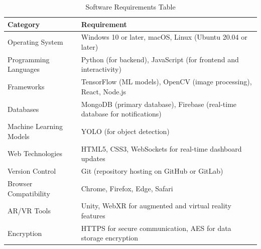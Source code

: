\begin{table}[H]
    \centering
    \begin{tabular}{|l|p{10cm}|}
        \hline
        \textbf{Category} & \textbf{Requirement} \\ \hline
        Operating System & Windows 10 or later, macOS, Linux (Ubuntu 20.04 or later) \\ \hline
        Programming Languages & Python (for backend), JavaScript (for frontend and interactivity) \\ \hline
        Frameworks & TensorFlow (ML models), OpenCV (image processing), React, Node.js \\ \hline
        Databases & MongoDB (primary database), Firebase (real-time database for notifications) \\ \hline
        Machine Learning Models & YOLO (for object detection) \\ \hline
        Web Technologies & HTML5, CSS3, WebSockets for real-time dashboard updates \\ \hline
        Version Control & Git (repository hosting on GitHub or GitLab) \\ \hline
        Browser Compatibility & Chrome, Firefox, Edge, Safari \\ \hline
        AR/VR Tools & Unity, WebXR for augmented and virtual reality features \\ \hline
        Encryption & HTTPS for secure communication, AES for data storage encryption \\ \hline
    \end{tabular}
    \caption{Software Requirements Table}
    \label{tab:software-requirements}
\end{table}

